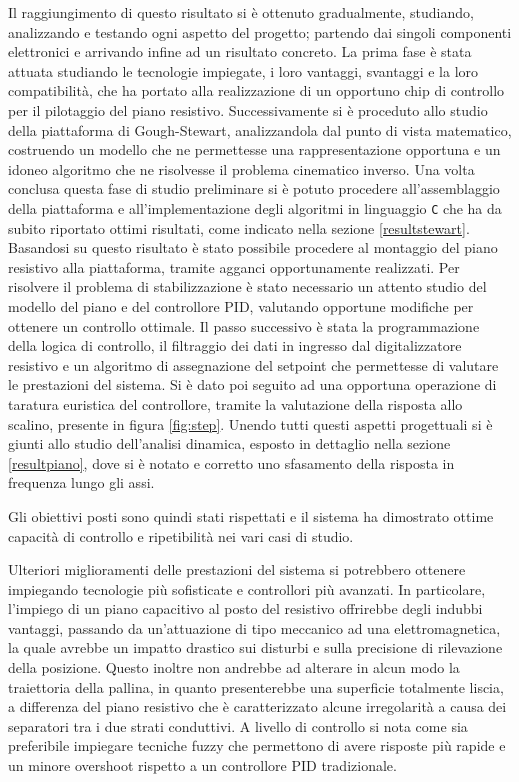 \documentclass[12pt,twoside,openright]{report}
\begin{document}
Il raggiungimento di questo risultato si è ottenuto gradualmente, studiando, analizzando e testando ogni aspetto del progetto; partendo dai singoli componenti elettronici e arrivando infine ad un risultato concreto.
La prima fase è stata attuata studiando le tecnologie impiegate, i loro vantaggi, svantaggi e la loro compatibilità, che ha portato alla realizzazione di un opportuno chip di controllo per il pilotaggio del piano resistivo. Successivamente si è proceduto allo studio della piattaforma di Gough-Stewart, analizzandola dal punto di vista matematico, costruendo un modello che ne permettesse una rappresentazione opportuna e un idoneo algoritmo che ne risolvesse il problema cinematico inverso. Una volta conclusa questa fase di studio preliminare si è potuto procedere all'assemblaggio della piattaforma e all'implementazione degli algoritmi in linguaggio \texttt{C} che ha da subito riportato ottimi risultati, come indicato nella sezione \ref{resultstewart}. Basandosi su questo risultato è stato possibile procedere al montaggio del piano resistivo alla piattaforma, tramite agganci opportunamente realizzati. Per risolvere il problema di stabilizzazione è stato necessario un attento studio del modello del piano e del controllore PID, valutando opportune modifiche per ottenere un controllo ottimale.  Il passo successivo è stata la programmazione della logica di controllo, il filtraggio dei dati in ingresso dal digitalizzatore resistivo e un algoritmo di assegnazione del setpoint che permettesse di valutare le prestazioni del sistema. Si è dato poi seguito ad una opportuna operazione di taratura euristica del controllore, tramite la valutazione della risposta allo scalino, presente in figura \ref{fig:step}. Unendo tutti questi aspetti progettuali si è giunti allo studio dell'analisi dinamica, esposto in dettaglio nella sezione \ref{resultpiano}, dove si è notato e corretto uno sfasamento della risposta in frequenza lungo gli assi. 

Gli obiettivi posti sono quindi stati rispettati e il sistema ha dimostrato ottime capacità di controllo e ripetibilità nei vari casi di studio. 

Ulteriori miglioramenti delle prestazioni del sistema si potrebbero ottenere impiegando tecnologie più sofisticate e controllori più avanzati.
In particolare, l'impiego di un piano capacitivo al posto del resistivo offrirebbe degli indubbi vantaggi, passando da un'attuazione di tipo meccanico ad una elettromagnetica, la quale avrebbe un impatto drastico sui disturbi e sulla precisione di rilevazione della posizione. Questo inoltre non andrebbe ad alterare in alcun modo la traiettoria della pallina, in quanto presenterebbe una superficie totalmente liscia, a differenza del piano resistivo che è caratterizzato alcune irregolarità a causa dei separatori tra i due strati conduttivi. A livello di controllo si nota come sia preferibile impiegare tecniche fuzzy\cite{tecnichecontrollo} che permettono di avere risposte più rapide e un minore overshoot rispetto a un controllore PID tradizionale.
\end{document}
